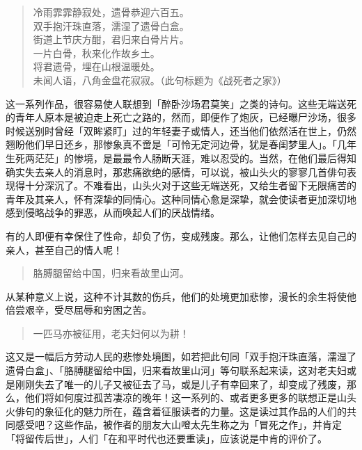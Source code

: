 {    \begin{quote}
        冷雨霏霏静寂处，遗骨恭迎六百五。\\
        双手抱汗珠直落，濡湿了遗骨白盒。\\
        街道上节庆方酣，君归来白骨片片。\\
        一片白骨，秋来化作故乡土。\\
        将君遗骨，埋在山根温暖处。\\
        未闻人语，八角金盘花寂寂。（此句标题为《战死者之家》）
    \end{quote}

    这一系列作品，很容易使人联想到「醉卧沙场君莫笑」之类的诗句。这些无端送死的青年人原本是被迫走上死亡之路的，然而，即便作了炮灰，已经曝尸沙场，很多时候送别时曾经「双眸紧盯」过的年轻妻子或情人，还当他们依然活在世上，仍然翘盼他们早日还乡，那惨象真不啻是「可怜无定河边骨，犹是春闺梦里人」。「几年生死两茫茫」的惨境，是最最令人肠断天涯，难以忍受的。当然，在他们最后得知确实失去亲人的消息时，那悲痛欲绝的感情，可以说，被山头火的寥寥几首俳句表现得十分深沉了。不难看出，山头火对于这些无端送死，又给生者留下无限痛苦的青年及其亲人，怀有深挚的同情心。这种同情心愈是深挚，就会使读者更加深切地感到侵略战争的罪恶，从而唤起人们的厌战情绪。

    有的人即便有幸保住了性命，却负了伤，变成残废。那么，让他们怎样去见自己的亲人，甚至自己的情人呢！

    \begin{quote}
        胳膊腿留给中国，归来看故里山河。
    \end{quote}

    从某种意义上说，这种不计其数的伤兵，他们的处境更加悲惨，漫长的余生将使他倍尝艰辛，受尽屈辱和穷困之苦。

    \begin{quote}
        一匹马亦被征用，老夫妇何以为耕！
    \end{quote}

    这又是一幅后方劳动人民的悲惨处境图，如若把此句同「双手抱汗珠直落，濡湿了遗骨白盒」、「胳膊腿留给中国，归来看故里山河」等句联系起来读，这对老夫妇或是刚刚失去了唯一的儿子又被征去了马，或是儿子有幸回来了，却变成了残废，那么，他们将如何度过孤苦凄凉的晚年！这一系列的、或者更多更多的联想正是山头火俳句的象征化的魅力所在，蕴含着征服读者的力量。这是读过其作品的人们的共同感受吧？这些作品，被作者的朋友大山噔太先生称之为「冒死之作」，并肯定「将留传后世」，人们「在和平时代也还要重读」\footnotemark[13]，应该说是中肯的评价了。


}
